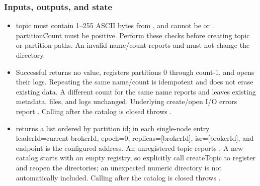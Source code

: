 \subsubsection*{Inputs, outputs, and state}
\begin{itemize}
\item topic must contain 1–255 ASCII bytes from \pathcode{[A-Za-z0-9._-]}, and cannot be  or . partitionCount must be positive. Perform these checks before creating topic or partition paths. An invalid name/count reports  and must not change the directory.
\item Successful  returns no value, registers partitions 0 through count-1, and opens their logs. Repeating the same name/count is idempotent and does not erase existing data. A different count for the same name reports  and leaves existing metadata, files, and logs unchanged. Underlying create/open I/O errors report . Calling after the catalog is closed throws .
\item {} returns a list ordered by partition id; in each single-node entry leaderId=current brokerId, epoch=0, replicas=[brokerId], isr=[brokerId], and endpoint is the configured address. An unregistered topic reports . A new catalog starts with an empty registry, so explicitly call createTopic to register and reopen the directories; an unexpected numeric directory is not automatically included. Calling after the catalog is closed throws .
\end{itemize}
